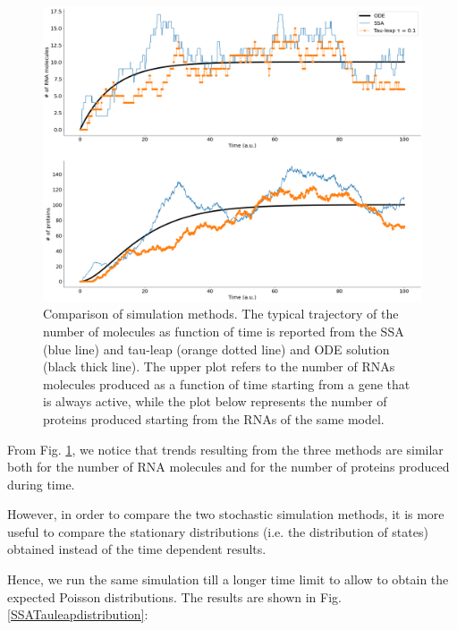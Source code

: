 \documentclass[12pt,a4paper]{report}
\begin{document}
\begin{figure}[!ht]
\centering
\includegraphics[scale=0.30]{ODESSATauleaptimeplot100au.png}
\caption{Comparison of simulation methods. The typical trajectory of the number of molecules as function of time is reported from the SSA (blue line) and tau-leap (orange dotted line) and ODE solution (black thick line). The upper plot refers to the number of RNAs molecules produced as a function of time starting from a gene that is always active, while the plot below represents the number of proteins produced starting from the RNAs of the same model.}
\label{ODESSATAULEAP}
\end{figure}

From Fig. \ref{ODESSATAULEAP}, we notice that trends resulting from the three methods are similar both for the number of RNA molecules and for the number of proteins produced during time. 

However, in order to compare the two stochastic simulation methods, it is more useful to compare the stationary distributions (i.e. the distribution of states) obtained instead of the time dependent results. 

Hence, we run the same simulation till a longer time limit to allow to obtain the expected Poisson distributions. The results are shown in Fig. \ref{SSATauleapdistribution}:
\end{document}
